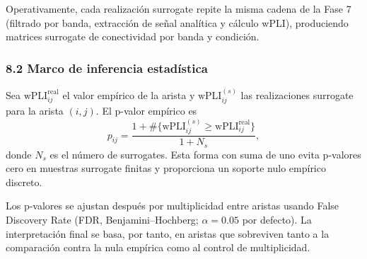 Operativamente, cada realización surrogate repite la misma cadena de la Fase 7 (filtrado por banda, extracción de señal analítica y cálculo wPLI), produciendo matrices surrogate de conectividad por banda y condición.

\subsubsection{8.2 Marco de inferencia estadística}
Sea $\mathrm{wPLI}^{\mathrm{real}}_{ij}$ el valor empírico de la arista y $\mathrm{wPLI}^{(s)}_{ij}$ las realizaciones surrogate para la arista $(i,j)$. El p-valor empírico es
\[
p_{ij}
=
\frac{1+\#\{\mathrm{wPLI}^{(s)}_{ij}\ge\mathrm{wPLI}^{\mathrm{real}}_{ij}\}}
{1+N_s},
\]
donde $N_s$ es el número de surrogates. Esta forma con suma de uno evita p-valores cero en muestras surrogate finitas y proporciona un soporte nulo empírico discreto.

Los p-valores se ajustan después por multiplicidad entre aristas usando False Discovery Rate (FDR, Benjamini--Hochberg; $\alpha=0.05$ por defecto). La interpretación final se basa, por tanto, en aristas que sobreviven tanto a la comparación contra la nula empírica como al control de multiplicidad.
